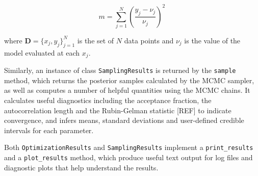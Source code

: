 \documentclass[12pt]{emulateapj}
\begin{document}
\[
m = \sum_{j=1}^{N}{\left( \frac{y_j - \nu_j}{\nu_j} \right)^2} \,
\]

\noindent where $\mathbf{D} = \{x_j, y_j\}_{j=1}^{N}$ is the set of $N$ data points and $\nu_j$ is the value of the model evaluated at each $x_j$.

Similarly, an instance of class \verb|SamplingResults| is returned by the \verb|sample| method, which returns the posterior samples calculated by the MCMC sampler, as well as computes a number of helpful quantities using the MCMC chains. It calculates useful diagnostics including the acceptance fraction, the autocorrelation length and the Rubin-Gelman statistic [REF] to indicate convergence, and infers means, standard deviations and user-defined credible intervals for each parameter.

Both \verb|OptimizationResults| and \verb|SamplingResults| implement a \verb|print_results| and a \verb|plot_results| method, which produce useful text output for log files and diagnostic plots that help understand the results.
\end{document}
